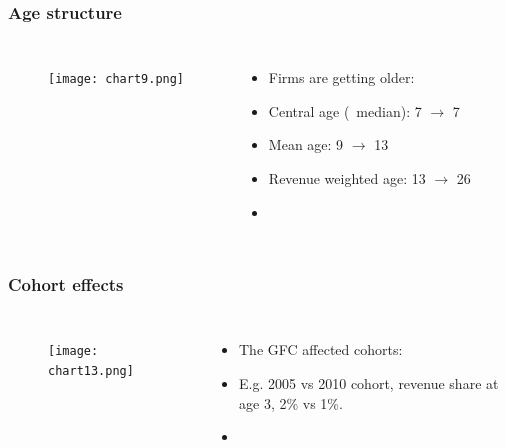 \documentclass{beamer}
\begin{document}
\begin{frame}
\frametitle{Age structure}

\begin{columns}


\begin{figure}
\centering
\texttt{[image: chart9.png]}
\end{figure}


\begin{itemize}
\item Firms are getting older:
\item Central age (~median): 7 $\rightarrow$ 7 
\item Mean age:  9 $\rightarrow$ 13 
\item Revenue weighted age: 13 $\rightarrow$ 26

\item \href{https://www.rapidcharts.io/productivity}{}
\end{itemize}


\end{columns}
\end{frame}


\begin{frame}
\frametitle{Cohort effects}

\begin{columns}


\begin{figure}
\centering
\texttt{[image: chart13.png]}
\end{figure}


\begin{itemize}
\item The GFC affected cohorts:
\item E.g. 2005 vs 2010 cohort, revenue share at age 3, 2\% vs 1\%.

\item \href{https://www.rapidcharts.io/productivity}{}
\end{itemize}


\end{columns}
\end{frame}
\end{document}
